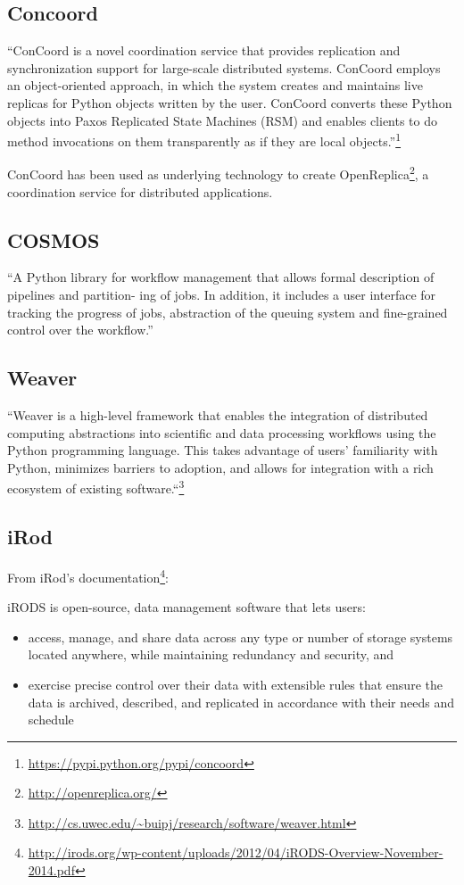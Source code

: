 \subsection{Concoord}
``ConCoord is a novel coordination service that provides replication and synchronization 
support for large-scale distributed systems. ConCoord employs an object-oriented approach, 
in which the system creates and maintains live replicas for Python objects written by the user. 
ConCoord converts these Python objects into Paxos Replicated State Machines (RSM) and enables clients
to do method invocations on them transparently as if they are local objects.''\footnote{\url{https://pypi.python.org/pypi/concoord}}

ConCoord has been used as underlying technology to create OpenReplica\footnote{\url{http://openreplica.org/}}, 
a coordination service for distributed applications.\cite{altinbuken2012commodifying}

\subsection{COSMOS}
``A Python library for workflow
management that allows formal description of pipelines and partition-
ing of jobs. In addition, it includes a user interface for tracking the
progress of jobs, abstraction of the queuing system and fine-grained
control over the workflow.''\cite{Gafni30062014}

\subsection{Weaver}
``Weaver\cite{Bui_weaver:integrating} is a high-level framework that enables the integration of distributed computing abstractions
into scientific and data processing workflows using the Python programming language. 
This takes advantage of users' familiarity with Python, minimizes barriers to adoption, 
and allows for integration with a rich ecosystem of existing software.``\footnote{\url{http://cs.uwec.edu/~buipj/research/software/weaver.html}}

\subsection{iRod}
From iRod's documentation\footnote{\url{http://irods.org/wp-content/uploads/2012/04/iRODS-Overview-November-2014.pdf}}:

iRODS is open-source, data management software that lets users:
\begin{itemize}
\item access, manage, and share data across any type or number of storage
systems located anywhere, while maintaining redundancy and security,
and
\item exercise precise control over their data with extensible rules that
ensure the data is archived, described, and replicated in accordance
with their needs and schedule
\end{itemize}

